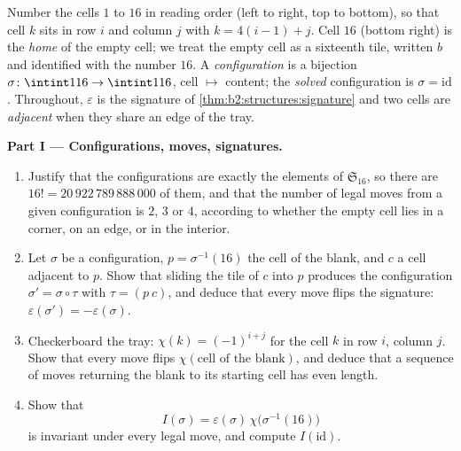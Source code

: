 \begin{problem}
\label{pb:b2:structures:1}
Number the cells $1$ to $16$ in reading order (left to right, top
to bottom), so that cell $k$ sits in row $i$ and column $j$ with $k
= 4(i - 1) + j$. Cell $16$ (bottom right) is the \emph{home} of
the empty cell; we treat the empty cell as a sixteenth tile,
written $b$ and identified with the number $16$. A
\emph{configuration} is a bijection $\sigma \colon \intint1{16}
\to \intint1{16}$, cell $\mapsto$ content; the \emph{solved}
configuration is $\sigma = \mathrm{id}$. Throughout,
$\varepsilon$ is the signature of
\cref{thm:b2:structures:signature} and two cells are
\emph{adjacent} when they share an edge of the tray.

\medskip
\noindent\textbf{Part I --- Configurations, moves, signatures.}
\begin{enumerate}
  \item Justify that the configurations are exactly the elements
        of $\mathfrak{S}_{16}$, so there are $16! =
        20\,922\,789\,888\,000$ of them, and that the number of
        legal moves from a given configuration is $2$, $3$ or $4$,
        according to whether the empty cell lies in a corner, on
        an edge, or in the interior.
  \item Let $\sigma$ be a configuration, $p = \sigma^{-1}(16)$ the
        cell of the blank, and $c$ a cell adjacent to $p$. Show
        that sliding the tile of $c$ into $p$ produces the
        configuration $\sigma' = \sigma \circ \tau$ with $\tau =
        (p\ c)$, and deduce that every move flips the signature:
        $\varepsilon(\sigma') = -\varepsilon(\sigma)$.
  \item Checkerboard the tray: $\chi(k) = (-1)^{i+j}$ for the cell
        $k$ in row $i$, column $j$. Show that every move flips
        $\chi(\text{cell of the blank})$, and deduce that a
        sequence of moves returning the blank to its starting cell
        has even length.
  \item Show that
        \[
        I(\sigma) = \varepsilon(\sigma)\,
        \chi\bigl(\sigma^{-1}(16)\bigr)
        \]
        is invariant under every legal move, and compute
        $I(\mathrm{id})$.
\end{enumerate}


\end{problem}
